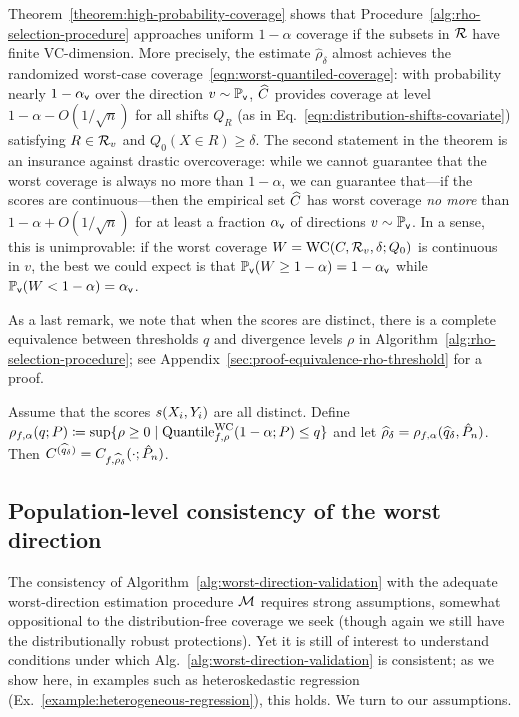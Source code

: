 Theorem~\ref{theorem:high-probability-coverage} shows that
Procedure~\ref{alg:rho-selection-procedure} approaches uniform $1-\alpha$
coverage if the subsets in $\mathcal{R}$ have finite VC-dimension. More
precisely, the estimate $\hat{\rho}_\delta$ almost achieves the randomized
worst-case coverage~\eqref{eqn:worst-quantiled-coverage}: with probability
nearly $1-\alpha_{\mathsf{v}}$ over the direction $v \sim \mathbb{P}_{\mathsf{v}}$, $\widehat{C}$ provides
coverage at level $1-\alpha - O(1/\sqrt{n})$ for all shifts $Q_R$ (as in
Eq.~\eqref{eqn:distribution-shifts-covariate}) satisfying $R \in \mathcal{R}_v$
and $Q_0(X \in R) \ge \delta$. The second statement in the theorem
is an insurance against drastic overcoverage:
while we cannot guarantee that the
worst coverage is always no more than $1 - \alpha$, we can guarantee
that---if the scores are continuous---then the empirical set $\widehat{C}$
has worst coverage \emph{no more} than $1 - \alpha + O(1/\sqrt{n})$
for at least a fraction $\alpha_{\mathsf{v}}$ of directions $v \sim \mathbb{P}_{\mathsf{v}}$.
In a sense, this is unimprovable: if the worst coverage
$W = \textup{WC}(C, \mathcal{R}_v, \delta; Q_0)$ is continuous
in $v$, the best we could expect is that
$\mathbb{P}_{\mathsf{v}}(W \ge 1 - \alpha) = 1 - \alpha_{\mathsf{v}}$ while
$\mathbb{P}_{\mathsf{v}}(W < 1 - \alpha) = \alpha_{\mathsf{v}}$.

As a last remark, we note that when the scores are distinct,
there is a complete equivalence between thresholds $q$ and
divergence levels $\rho$ in Algorithm~\ref{alg:rho-selection-procedure};
see Appendix~\ref{sec:proof-equivalence-rho-threshold} for a proof.
\begin{lemma}
  \label{lemma:equivalence-rho-threshold}
  Assume that the scores $s(X_i, Y_i)$ are all distinct.
  Define $\rho_{f, \alpha}(q; P) \coloneqq \sup\{\rho \ge 0 \mid
  \textup{Quantile}^{\textup{WC}}_{f,\rho}(1 - \alpha; P) \le q\}$ and let
  $\widehat{\rho}_\delta = \rho_{f,\alpha}(\widehat{q}_\delta, \hat{P}_n)$. Then
  $C^{(\widehat{q}_\delta)} = C_{f, \widehat{\rho}_\delta}(\cdot; \hat{P}_n)$.
\end{lemma}

\subsection{Population-level consistency of the worst direction}
\label{subsec:population-level-consistency}
The consistency of Algorithm~\ref{alg:worst-direction-validation} with the adequate worst-direction estimation procedure $\mathcal{M}$ requires strong
assumptions, somewhat oppositional to the distribution-free coverage we seek
(though again we still have the distributionally robust protections).  Yet
it is still of interest to understand conditions under which Alg.~\ref{alg:worst-direction-validation} is consistent; as we show here,
in examples such as heteroskedastic regression
(Ex.~\ref{example:heterogeneous-regression}), this holds.
We turn to our assumptions.

